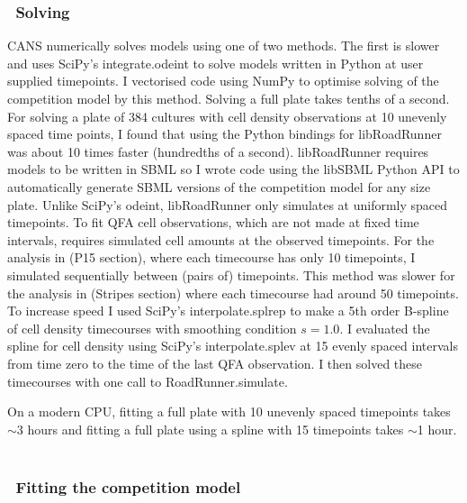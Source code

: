 \subsubsection{\thesubsubsection~Solving}
\label{sec:solving_comp}

CANS numerically solves models using one of two methods. The first is
slower and uses SciPy's integrate.odeint to solve models written in
Python at user supplied timepoints. I vectorised code using NumPy to
optimise solving of the competition model by this method. Solving a
full plate takes tenths of a second. For solving a plate of 384
cultures with cell density observations at 10 unevenly spaced time
points, I found that using the Python bindings for libRoadRunner was
about 10 times faster (hundredths of a second). libRoadRunner requires
models to be written in SBML so I wrote code using the libSBML Python
API to automatically generate SBML versions of the competition model
for any size plate.
Unlike SciPy's odeint, libRoadRunner only simulates at uniformly
spaced timepoints. To fit QFA cell observations, which are not made at
fixed time intervals, requires simulated cell amounts at the observed
timepoints. For the analysis in (P15 section), where each timecourse
has only 10 timepoints, I simulated sequentially between (pairs of)
timepoints. This method was slower for the analysis in (Stripes
section) where each timecourse had around 50 timepoints. To increase
speed I used SciPy's interpolate.splrep to make a 5th order B-spline
of cell density timecourses with smoothing condition \(s=1.0\). I
evaluated the spline for cell density using SciPy's interpolate.splev
at 15 evenly spaced intervals from time zero to the time of the last
QFA observation. I then solved these
timecourses with one call to RoadRunner.simulate.

On a modern CPU, fitting a full plate with 10 unevenly spaced
timepoints takes \(\sim\)3 hours and fitting a full plate using a
spline with 15 timepoints takes \(\sim\)1 hour.
\\\\

\subsubsection{\thesubsubsection~Fitting the competition model}
\label{sec:fitting_comp}

